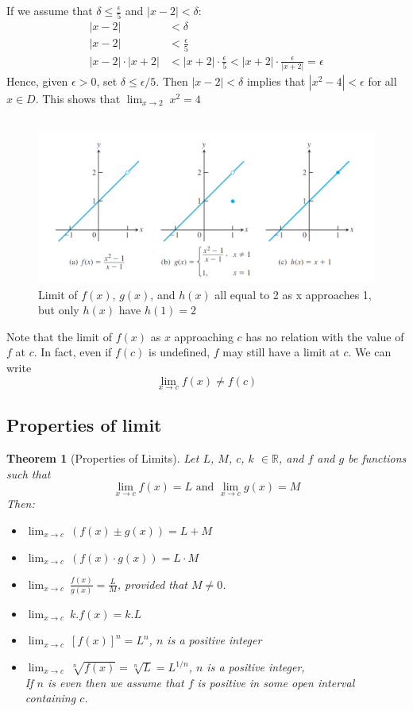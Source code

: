 \documentclass[12pt]{article}
\newtheorem{theorem}{Theorem}
\begin{document}
\noindent
If we assume that $\delta \leq \frac{\epsilon}{5}$ and $|x - 2| < \delta$:
\begin{align*} 
     |x - 2| &< \delta \\
     |x - 2| &< \frac{\epsilon}{5} \\
     |x - 2|\cdot|x + 2| &< |x + 2|\cdot \frac{\epsilon}{5} <  |x + 2|\cdot \frac{\epsilon}{|x + 2|} = \epsilon
\end{align*}
Hence, given $\epsilon > 0$, set $\delta \leq \epsilon / 5$. Then  $|x - 2| < \delta$  implies that $|x^2 - 4| < \epsilon$ 
for all $x \in D$. This shows that $\lim_{x \to 2} \; x^2 = 4$ \\ \\

\begin{figure}[h!]
    \centering
    \includegraphics[width=0.8\linewidth]{images/limit and function.png}
    \caption{Limit of $f(x)$, $g(x)$, and $h(x)$ all equal to 2 as x approaches 1, but only $h(x)$ have $h(1) = 2$ }
\end{figure}

\noindent
Note that the limit of $f(x)$ as $x$ approaching $c$ has no relation with the value
of $f$ at $c$. In fact, even if $f(c)$ is undefined, $f$ may still have a limit
at $c$. We can write
\[
    \lim_{x \to c} f(x) \neq f(c)
\]

\subsection{Properties of limit}
\begin{theorem}[Properties of Limits]
    \label{properties}
Let $L$, $M$, $c$, $k$ $\in \mathbb{R} $, and $f$ and $g$ be functions such that
\[
    \lim_{x \to c} f(x) = L \textrm{ and } \lim_{x \to c} g(x) = M
\]
Then:
\begin{itemize} 
     \item $\lim_{x \to c} \: (f(x) \pm g(x)) = L + M$
     \item $\lim_{x \to c} \: (f(x) \cdot g(x)) = L \cdot M$
     \item $\lim_{x \to c} \: \frac{f(x)}{g(x)} = \frac{L}{M}$, provided that $M \neq 0$.
     \item $\lim_{x \to c} \: k.f(x) = k.L$
     \item $\lim_{x \to c} \: [f(x)]^n = L^n$, $n$ is a positive integer
     \item $\lim_{x \to c} \: \sqrt[n]{f(x)} = \sqrt[n]{L} = L^{1/n}$, $n$ is a positive integer, \\ If $n$ is even then we
     assume that $f$ is positive in some open interval containing $c$.
\end{itemize}
\end{theorem}
\end{document}
